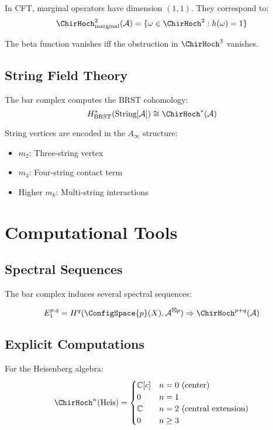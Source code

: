 In CFT, marginal operators have dimension $(1,1)$. They correspond to:
$$\ChirHoch^2_{\text{marginal}}(\mathcal{A}) = \{\omega \in \ChirHoch^2 : h(\omega) = 1\}$$

The beta function vanishes iff the obstruction in $\ChirHoch^3$ vanishes.

\subsection{String Field Theory}

The bar complex computes the BRST cohomology:
$$H^*_{\text{BRST}}(\text{String}[\mathcal{A}]) \cong \ChirHoch^*(\mathcal{A})$$

String vertices are encoded in the $A_\infty$ structure:
\begin{itemize}
\item $m_2$: Three-string vertex
\item $m_3$: Four-string contact term
\item Higher $m_k$: Multi-string interactions
\end{itemize}

\section{Computational Tools}

\subsection{Spectral Sequences}

The bar complex induces several spectral sequences:

\begin{theorem}
$$E_1^{p,q} = H^q(\ConfigSpace{p}(X), \mathcal{A}^{\boxtimes p}) \Rightarrow \ChirHoch^{p+q}(\mathcal{A})$$
\end{theorem}

\subsection{Explicit Computations}

For the Heisenberg algebra:
$$\ChirHoch^n(\text{Heis}) = \begin{cases}
\mathbb{C}[c] & n = 0 \text{ (center)} \\
0 & n = 1 \\
\mathbb{C} & n = 2 \text{ (central extension)} \\
0 & n \geq 3
\end{cases}$$

